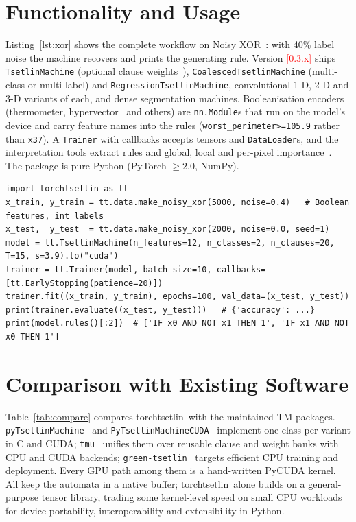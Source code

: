 \documentclass[twoside,11pt]{article}
\newcommand{\ph}[1]{\textcolor{red}{[#1]}}
\newcommand{\code}[1]{\texttt{#1}}
\newcommand{\lib}{\textsf{torchtsetlin}}
\begin{document}
\section{Functionality and Usage}
\label{sec:usage}

Listing~\ref{lst:xor} shows the complete workflow on Noisy XOR~\citep{granmo2018tsetlin}: with
40\% label noise the machine recovers and prints the generating rule. Version \ph{0.3.x} ships
\code{TsetlinMachine} (optional clause weights~\citep{phoulady2019weighted}),
\code{CoalescedTsetlinMachine} (multi-class or multi-label) and \code{RegressionTsetlinMachine},
convolutional 1-D, 2-D and 3-D variants of each, and dense segmentation machines. Booleanisation
encoders (thermometer, hypervector~\citep{halenka2024hypervectors} and others) are \code{nn.Module}s that run on the model's device and carry feature names
into the rules (\code{worst\_perimeter>=105.9} rather than \code{x37}). A \code{Trainer} with
callbacks accepts tensors and \code{DataLoader}s, and the interpretation tools extract rules
and global, local and per-pixel importance~\citep{blakely2020closedform}. The package is pure Python (PyTorch $\ge 2.0$, NumPy).

\begin{lstlisting}[style=py, float=t, caption={Training, evaluating and reading a Tsetlin machine on Noisy XOR.}, label={lst:xor}]
import torchtsetlin as tt
x_train, y_train = tt.data.make_noisy_xor(5000, noise=0.4)   # Boolean features, int labels
x_test,  y_test  = tt.data.make_noisy_xor(2000, noise=0.0, seed=1)
model = tt.TsetlinMachine(n_features=12, n_classes=2, n_clauses=20, T=15, s=3.9).to("cuda")
trainer = tt.Trainer(model, batch_size=10, callbacks=[tt.EarlyStopping(patience=20)])
trainer.fit((x_train, y_train), epochs=100, val_data=(x_test, y_test))
print(trainer.evaluate((x_test, y_test)))   # {'accuracy': ...}
print(model.rules()[:2])  # ['IF x0 AND NOT x1 THEN 1', 'IF x1 AND NOT x0 THEN 1']
\end{lstlisting}

\section{Comparison with Existing Software}
\label{sec:comparison}

Table~\ref{tab:compare} compares \lib\ with the maintained TM packages.
\code{pyTsetlinMachine}~\citep{software_pytsetlinmachine} and
\code{PyTsetlinMachineCUDA}~\citep{software_pytsetlinmachinecuda} implement one class per
variant in C and CUDA; \code{tmu}~\citep{software_tmu} unifies them over reusable clause and
weight banks with CPU and CUDA backends; \code{green-tsetlin}~\citep{software_greentsetlin,greentsetlin2024}
targets efficient CPU training and deployment. Every GPU path among them is a hand-written
PyCUDA kernel. All keep the automata in a native buffer; \lib\
alone builds on a general-purpose tensor library, trading some kernel-level speed on small CPU
workloads for device portability, interoperability and extensibility in Python.
\end{document}
